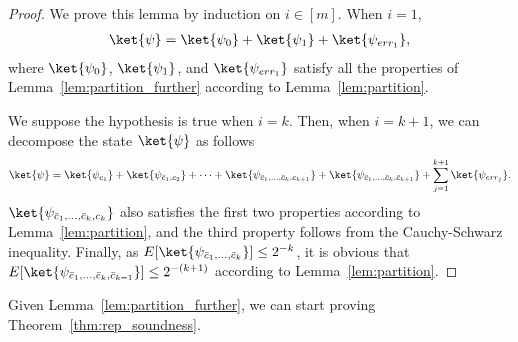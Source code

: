 \begin{proof}
We prove this lemma by induction on $i\in [m]$. 
When $i=1$, 
\begin{align*}
    \ket{\psi} =  \ket{\psi_0} + \ket{\psi_1} + \ket{\psi_{err_1}}, 
\end{align*}
where $\ket{\psi_0}$, $\ket{\psi_1}$, and $\ket{\psi_{err_1}}$ satisfy all the properties of Lemma~\ref{lem:partition_further} according to Lemma~\ref{lem:partition}. 

We suppose the hypothesis is true when $i=k$. Then, when $i=k+1$, we can decompose the state $\ket{\psi}$ as follows
\begin{align*}
    \ket{\psi} =  \ket{\psi_{c_1}}+ \ket{\psi_{\bar{c}_1,c_2}} + \cdots + \ket{\psi_{\bar{c}_1,\dots, \bar{c}_k,c_{k+1}}} + \ket{\psi_{\bar{c}_1,\dots, \bar{c}_k,\bar{c}_{k+1}}}+ \sum_{j=1}^{k+1}\ket{\psi_{err_j}}.
\end{align*}
$\ket{\psi_{\bar{c}_1,\dots, \bar{c}_k,c_k}}$ also satisfies the first two properties according to Lemma~\ref{lem:partition}, and the third property follows from the Cauchy-Schwarz inequality. Finally, as $E[\ket{\psi_{\bar{c}_1,\dots, \bar{c}_k}}]\leq 2^{-k}$, it is obvious that $E[\ket{\psi_{\bar{c}_1,\dots, \bar{c}_k,\bar{c}_{k=1}}}]\leq 2^{-(k+1)}$ according to Lemma~\ref{lem:partition}. 
\end{proof}

Given Lemma~\ref{lem:partition_further}, we can start proving Theorem~\ref{thm:rep_soundness}. 

